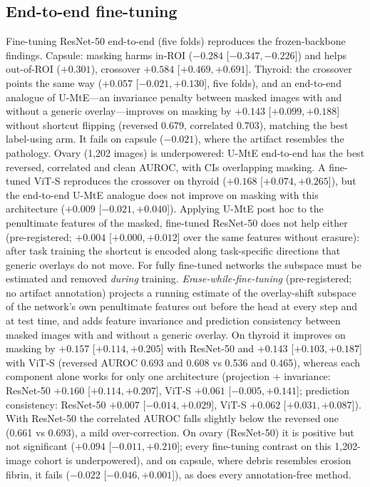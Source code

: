 \subsection{End-to-end fine-tuning}\label{sec:ft}
Fine-tuning ResNet-50 end-to-end (five folds) reproduces the frozen-backbone findings. Capsule: masking harms
in-ROI ($-0.284$ [$-0.347, -0.226$]) and helps out-of-ROI ($+0.301$), crossover $+0.584$ [$+0.469, +0.691$].
Thyroid: the crossover points the same way ($+0.057$ [$-0.021, +0.130$], five folds), and an end-to-end analogue of
U-MtE---an invariance penalty between masked images with and without a generic overlay---improves on masking by
$+0.143$ [$+0.099, +0.188$] without shortcut flipping (reversed 0.679, correlated 0.703), matching the best
label-using arm. It fails on capsule ($-0.021$), where the artifact resembles the pathology. Ovary (1,202 images)
is underpowered: U-MtE end-to-end has the best reversed, correlated and clean AUROC, with CIs overlapping masking.
A fine-tuned ViT-S reproduces the crossover on thyroid ($+0.168$ [$+0.074, +0.265$]), but the end-to-end U-MtE
analogue does not improve on masking with this architecture ($+0.009$ [$-0.021, +0.040$]). Applying U-MtE post hoc to
the penultimate features of the masked, fine-tuned ResNet-50 does not help either (pre-registered; $+0.004$
[$+0.000, +0.012$] over the same features without erasure): after task training the shortcut is encoded along
task-specific directions that generic overlays do not move. For fully fine-tuned networks the subspace must be
estimated and removed \emph{during} training. \emph{Erase-while-fine-tuning} (pre-registered; no artifact annotation)
projects a running estimate of the overlay-shift subspace of the network's own penultimate features out before the
head at every step and at test time, and adds feature invariance and prediction consistency between masked images with
and without a generic overlay. On thyroid it improves on masking by $+0.157$ [$+0.114, +0.205$] with ResNet-50 and
$+0.143$ [$+0.103, +0.187$] with ViT-S (reversed AUROC 0.693 and 0.608 vs 0.536 and 0.465), whereas each component
alone works for only one architecture (projection + invariance: ResNet-50 $+0.160$ [$+0.114, +0.207$], ViT-S $+0.061$
[$-0.005, +0.141$]; prediction consistency: ResNet-50 $+0.007$ [$-0.014, +0.029$], ViT-S $+0.062$ [$+0.031, +0.087$]).
With ResNet-50 the correlated AUROC falls slightly below the reversed one (0.661 vs 0.693), a mild over-correction.
On ovary (ResNet-50) it is positive but not significant ($+0.094$ [$-0.011, +0.210$]; every fine-tuning contrast on this
1,202-image cohort is underpowered), and on capsule, where debris resembles erosion fibrin, it fails ($-0.022$
[$-0.046, +0.001$]), as does every annotation-free method.

